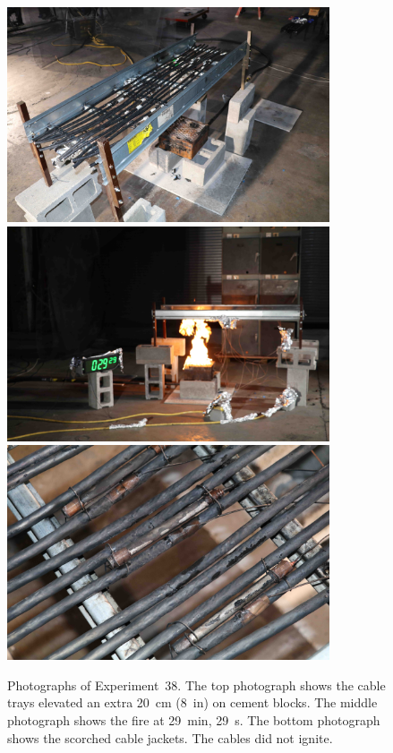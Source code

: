 \begin{figure}[p]
\centering
\includegraphics[height=2.50in]{../FIGURES/Test_38_setup} \\
\includegraphics[height=2.50in]{../FIGURES/Test_38_29_min_29_s} \\
\includegraphics[height=2.50in]{../FIGURES/Test_38_damage}
\caption[Photographs of Experiment~38]{Photographs of Experiment~38. The top photograph shows the cable trays elevated an extra 20~cm (8~in) on cement blocks. The middle photograph shows the fire at 29~min, 29~s. The bottom photograph shows the scorched cable jackets. The cables did not ignite.}
\label{fig:Test_38_photos}
\end{figure}



